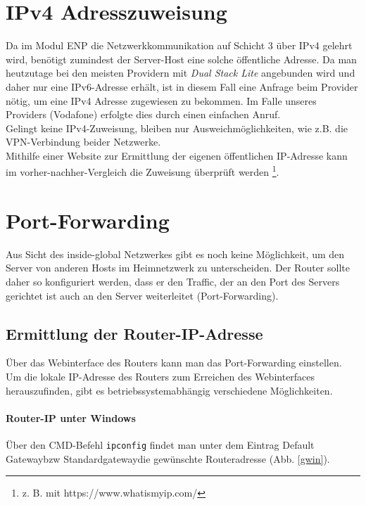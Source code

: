 \documentclass[11pt, a4paper]{article}
\newcommand{\code}[1]{{\lstinline{#1}}}
\begin{document}
\section{IPv4 Adresszuweisung}

Da im Modul ENP die Netzwerkkommunikation auf Schicht 3 über IPv4 gelehrt wird,
benötigt zumindest der Server-Host eine solche öffentliche Adresse.
Da man heutzutage bei den meisten Providern mit \emph{Dual Stack Lite}
angebunden wird und daher nur eine IPv6-Adresse erhält, ist in diesem Fall eine
Anfrage beim Provider nötig, um eine IPv4 Adresse zugewiesen zu bekommen.
Im Falle unseres Providers (Vodafone) erfolgte dies durch einen einfachen Anruf.\\

Gelingt keine IPv4-Zuweisung, bleiben nur Ausweichmöglichkeiten, wie z.B. die
VPN-Verbindung beider Netzwerke.\\

Mithilfe einer Website zur Ermittlung der eigenen öffentlichen IP-Adresse kann
im vorher-nachher-Vergleich die Zuweisung überprüft werden
\footnote{z. B. mit https://www.whatismyip.com/}.

\section{Port-Forwarding}
Aus Sicht des inside-global Netzwerkes gibt es noch keine Möglichkeit,
um den Server von anderen Hosts im Heimnetzwerk zu unterscheiden.
Der Router sollte daher so konfiguriert werden, dass er den Traffic,
der an den Port des Servers gerichtet ist auch an den Server
weiterleitet (Port-Forwarding).

\subsection{Ermittlung der Router-IP-Adresse}
Über das Webinterface des Routers kann man das Port-Forwarding einstellen. Um
die lokale IP-Adresse des Routers zum Erreichen des Webinterfaces herauszufinden,
gibt es betriebssystemabhängig verschiedene Möglichkeiten.

\paragraph{Router-IP unter Windows}
Über den CMD-Befehl \code{ipconfig} findet man unter dem Eintrag
\glqq Default Gateway\grqq bzw \glqq Standardgateway\grqq die gewünschte
Routeradresse (Abb. \ref{gwin}).
\end{document}

